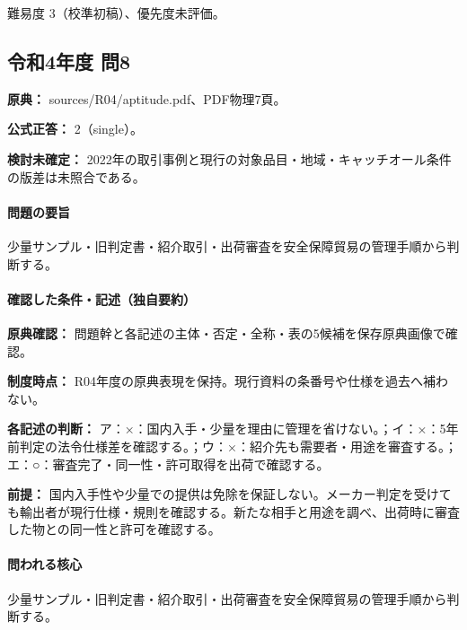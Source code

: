 \par 難易度 3（校準初稿）、優先度未評価。

\subsection{令和4年度 問8}
\label{q:r04-reg-apt-08}

\noindent\textbf{原典：} sources/R04/aptitude.pdf、PDF物理7頁。

\textbf{公式正答：} 2（single）。

\par\textbf{検討未確定：} 2022年の取引事例と現行の対象品目・地域・キャッチオール条件の版差は未照合である。

\paragraph{問題の要旨} 少量サンプル・旧判定書・紹介取引・出荷審査を安全保障貿易の管理手順から判断する。

\paragraph{確認した条件・記述（独自要約）}\mbox{}\par

\noindent\textbf{原典確認：} 問題幹と各記述の主体・否定・全称・表の5候補を保存原典画像で確認。\par

\noindent\textbf{制度時点：} R04年度の原典表現を保持。現行資料の条番号や仕様を過去へ補わない。\par

\noindent\textbf{各記述の判断：} ア：×：国内入手・少量を理由に管理を省けない。；イ：×：5年前判定の法令仕様差を確認する。；ウ：×：紹介先も需要者・用途を審査する。；エ：○：審査完了・同一性・許可取得を出荷で確認する。\par

\noindent\textbf{前提：} 国内入手性や少量での提供は免除を保証しない。メーカー判定を受けても輸出者が現行仕様・規則を確認する。新たな相手と用途を調べ、出荷時に審査した物との同一性と許可を確認する。\par

\paragraph{問われる核心} 少量サンプル・旧判定書・紹介取引・出荷審査を安全保障貿易の管理手順から判断する。

